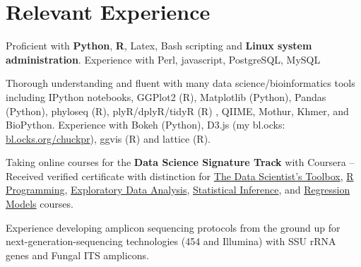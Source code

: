 \documentclass[letterpaper]{article}
\renewenvironment{itemize}{
  \begin{list}{}{
    \setlength{\leftmargin}{1.5em}
  }
}{
  \end{list}
}
\begin{document}
\section*{Relevant Experience}
\begin{itemize}
        {\small
    \item Proficient with \textbf{Python}, \textbf{R}, Latex, Bash
        scripting and \textbf{Linux system administration}. Experience
        with Perl, javascript, PostgreSQL, MySQL
    \item Thorough understanding and fluent with many data
        science/bioinformatics tools including IPython notebooks,
        GGPlot2 (R), Matplotlib (Python), Pandas (Python), phyloseq
        (R), plyR/dplyR/tidyR (R) , QIIME, Mothur, Khmer, and BioPython.
        Experience with Bokeh (Python), D3.js (my bl.ocks:
        \href{http://bl.ocks.org/chuckpr}{bl.ocks.org/chuckpr}), ggvis
        (R) and lattice (R).
    \item Taking online courses for the \textbf{Data Science
        Signature Track} with Coursera -- Received verified
        certificate with distinction for 
        \href{https://www.coursera.org/verify/TVZ2AX26SJ}{The Data Scientist's Toolbox},
        \href{https://www.coursera.org/verify/SB25Y92UJ6}{R Programming}, 
        \href{https://www.coursera.org/account/accomplishments/records/J75Um8uqQcrzBGDg}{Exploratory Data Analysis}, 
        \href{https://www.coursera.org/account/accomplishments/records/TXAWtJZV6hSe2U8G}{Statistical Inference}, and
        \href{https://www.coursera.org/account/accomplishments/records/pTVzUYHgx4sbcUmY}{Regression Models}
        courses.
    \item Experience developing amplicon sequencing protocols from the
        ground up for next-generation-sequencing technologies (454 and
        Illumina) with SSU rRNA genes and Fungal ITS amplicons.
        }
\end{itemize}
\end{document}
